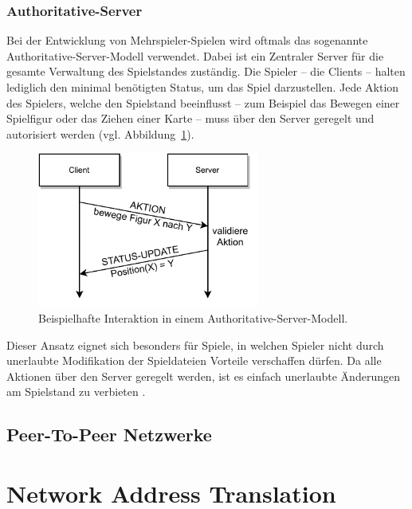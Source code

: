 \subsubsection{Authoritative-Server}
Bei der Entwicklung von Mehrspieler-Spielen wird oftmals das sogenannte \glqq{}Authoritative-Server\grqq{}-Modell verwendet. Dabei ist ein Zentraler Server für die gesamte Verwaltung des Spielstandes zuständig. Die Spieler -- die Clients -- halten lediglich den minimal benötigten Status, um das Spiel darzustellen. Jede Aktion des Spielers, welche den Spielstand beeinflusst -- zum Beispiel das Bewegen einer Spielfigur oder das Ziehen einer Karte -- muss über den Server geregelt und autorisiert werden \cite{authservermodel} (vgl. Abbildung~\ref{figure:authserver}).\par

\begin{figure}[h]
\centering
\includegraphics[width=0.65\textwidth]{bilder/PDF_SVG/AUTH_SERVER.pdf}
\caption{Beispielhafte Interaktion in einem Authoritative-Server-Modell.}
\label{figure:authserver}
\end{figure}

Dieser Ansatz eignet sich besonders für Spiele, in welchen Spieler nicht durch unerlaubte Modifikation der Spieldateien Vorteile verschaffen dürfen. Da alle Aktionen über den Server geregelt werden, ist es einfach unerlaubte Änderungen am Spielstand zu verbieten \cite{authservermodel}.\par

\subsection{Peer-To-Peer Netzwerke}

\section{Network Address Translation}

